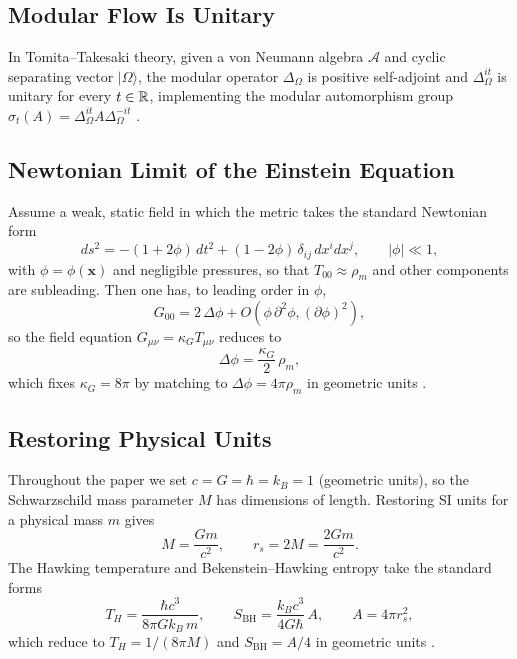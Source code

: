 \subsection{Modular Flow Is Unitary}
\label{app:modular_unitary}
In Tomita--Takesaki theory, given a von Neumann algebra $\mathcal{A}$ and cyclic separating vector $|\Omega\rangle$, the modular operator $\Delta_\Omega$ is positive self-adjoint and $\Delta_\Omega^{it}$ is unitary for every $t\in\mathbb{R}$, implementing the modular automorphism group $\sigma_t(A)=\Delta_\Omega^{it}A\Delta_\Omega^{-it}$ \cite{Takesaki2002}.

\subsection{Newtonian Limit of the Einstein Equation}
\label{app:newtonian_limit}
Assume a weak, static field in which the metric takes the standard Newtonian form \cite{Wald1984}
\begin{equation}
  ds^2 = -(1+2\phi)\,dt^2 + (1-2\phi)\,\delta_{ij}\,dx^i dx^j,
  \qquad |\phi|\ll 1,
\end{equation}
with $\phi=\phi(\mathbf{x})$ and negligible pressures, so that $T_{00}\approx \rho_m$ and other components are subleading.
Then one has, to leading order in $\phi$,
\begin{equation}
  G_{00} = 2\,\Delta \phi + O(\phi\,\partial^2\phi,(\partial\phi)^2),
\end{equation}
so the field equation $G_{\mu\nu}=\kappa_G T_{\mu\nu}$ reduces to
\begin{equation}
  \Delta \phi = \frac{\kappa_G}{2}\,\rho_m,
\end{equation}
which fixes $\kappa_G=8\pi$ by matching to $\Delta\phi = 4\pi\rho_m$ in geometric units \cite{Wald1984}.

\subsection{Restoring Physical Units}
\label{app:units_restore}
Throughout the paper we set $c=G=\hbar=k_B=1$ (geometric units), so the Schwarzschild mass parameter $M$ has dimensions of length. Restoring SI units for a physical mass $m$ gives
\begin{equation}
  M=\frac{Gm}{c^2},\qquad r_s=2M=\frac{2Gm}{c^2}.
\end{equation}
The Hawking temperature and Bekenstein--Hawking entropy take the standard forms
\begin{equation}
  T_H=\frac{\hbar c^3}{8\pi G k_B\, m},\qquad
  S_{\mathrm{BH}}=\frac{k_B c^3}{4G\hbar}\,A,\qquad A=4\pi r_s^2,
\end{equation}
which reduce to $T_H=1/(8\pi M)$ and $S_{\mathrm{BH}}=A/4$ in geometric units \cite{Hawking1975,HartleHawking1976,BirrellDavies1982,Wald1994}.

